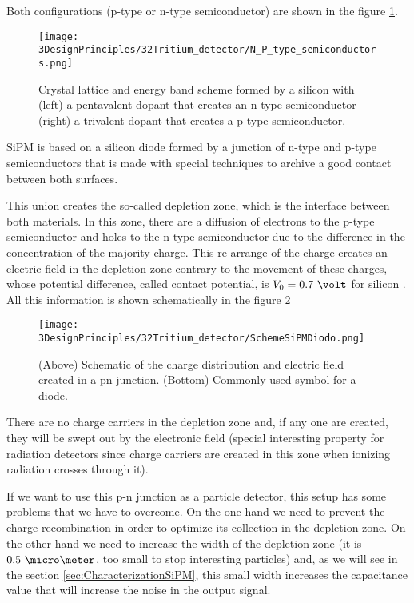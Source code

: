 Both configurations (p-type or n-type semiconductor) are shown in the figure \ref{fig:NPType_SC}.

\begin{figure}[htbp]
\centering
\texttt{[image: 3DesignPrinciples/32Tritium\_detector/N\_P\_type\_semiconductors.png]}
\caption{Crystal lattice and energy band scheme formed by a silicon with (left) a pentavalent dopant that creates an n-type semiconductor (right) a trivalent dopant that creates a p-type semiconductor. \label{fig:NPType_SC}~\cite{Leo}}
\end{figure}

SiPM is based on a silicon diode formed by a junction of n-type and p-type semiconductors that is made with special techniques to archive a good contact between both surfaces.

This union creates the so-called depletion zone, which is the interface between both materials. In this zone, there are a diffusion of electrons to the p-type semiconductor and holes to the n-type semiconductor due to the difference in the concentration of the majority charge. This re-arrange of the charge creates an electric field in the depletion zone contrary to the movement of these charges, whose potential difference, called contact potential, is $V_0 = 0.7~\volt$ for silicon \cite{Leo}. All this information is shown schematically in the figure \ref{fig:DiodeScheme}

\begin{figure}[htbp]
\centering
\texttt{[image: 3DesignPrinciples/32Tritium\_detector/SchemeSiPMDiodo.png]}
\caption{(Above) Schematic of the charge distribution and electric field created in a pn-junction. (Bottom) Commonly used symbol for a diode.\label{fig:DiodeScheme}~\cite{TesisNEXTSiPMs}}
\end{figure}

There are no charge carriers in the depletion zone and, if any one are created, they will be swept out by the electronic field (special interesting property for radiation detectors since charge carriers are created in this zone when ionizing radiation crosses through it).

If we want to use this p-n junction as a particle detector, this setup has some problems that we have to overcome. On the one hand we need to prevent the charge recombination in order to optimize its collection in the depletion zone. On the other hand we need to increase the width of the depletion zone (it is $0.5~\micro\meter$, too small to stop interesting particles) and, as we will see in the section \ref{sec:CharacterizationSiPM}, this small width increases the capacitance value that will increase the noise in the output signal.

